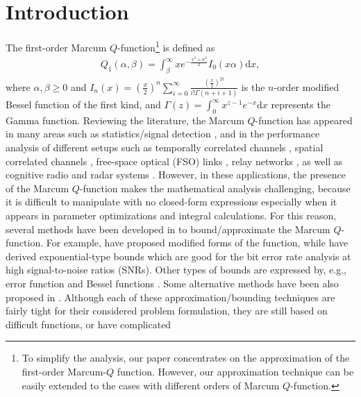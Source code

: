 \section{Introduction}
The first-order Marcum $Q$-function\footnote{To simplify the analysis, our paper concentrates on the approximation of the first-order Marcum-$Q$ function. However, our approximation technique can be easily extended to the cases with different orders of Marcum $Q$-function.} is defined as  \cite[Eq. (1)]{Bocus2013CLapproximation}
\begin{align}
    Q_1(\alpha,\beta) = \int_{\beta}^{\infty} xe^{-\frac{x^2+\alpha^2}{2}}I_0(x\alpha)\text{d}x,
\end{align}
where $\alpha, \beta \geq 0$ and $I_n(x) = (\frac{x}{2})^n \sum_{i=0}^{\infty}\frac{(\frac{x}{2})^{2i} }{i!\Gamma(n+i+1)}$ is the $n$-order modified Bessel function of the first kind, and $\Gamma(z) = \int_0^{\infty} x^{z-1}e^{-x} \mathrm{d}x$ represents the Gamma function. Reviewing the literature, the Marcum $Q$-function has appeared in many areas such as statistics/signal detection \cite{helstrom1994elements}, and in the performance analysis of different setups such as temporally correlated channels \cite{Makki2013TCfeedback}, spatial correlated channels \cite{Makki2011Eurasipcapacity},  free-space optical (FSO) links \cite{Makki2018WCLwireless}, relay networks \cite{Makki2016TVTperformance}, as well as  cognitive radio and radar systems \cite{Simon2003TWCsome,Suraweera2010TVTcapacity,Kang2003JSAClargest,Chen2004TCdistribution,Ma2000JSACunified,Zhang2002TCgeneral,Ghasemi2008ICMspectrum,Digham2007TCenergy, simon2002bookdigital,Cao2016CLsolutions,sofotasios2015solutions,Cui2012ELtwo,Azari2018TCultra,Alam2014INFOCOMWrobust,Gao2018IAadmm,Shen2018TVToutage,Song2017JLTimpact,Tang2019IAan}. However, in these applications, the presence of the Marcum $Q$-function makes the mathematical analysis challenging, because it is  difficult to manipulate  with no closed-form  expressions especially when it appears in parameter optimizations and integral calculations. For this reason, several methods have been developed in \cite{Bocus2013CLapproximation,Fu2011GLOBECOMexponential,zhao2008ELtight,Simon2000TCexponential,annamalai2001WCMCcauchy,Sofotasios2010ISWCSnovel,Li2010TCnew,andras2011Mathematicageneralized,Gaur2003TVTsome,Kam2008TCcomputing,Corazza2002TITnew,Baricz2009TITnew,chiani1999ELintegral}  to bound/approximate the Marcum $Q$-function. For example, \cite{Fu2011GLOBECOMexponential,zhao2008ELtight} have proposed  modified forms of the function, while \cite{Simon2000TCexponential,annamalai2001WCMCcauchy} have derived exponential-type bounds which are good for the bit error rate analysis at high signal-to-noise ratios (SNRs). Other types of bounds are expressed by, e.g., error function \cite{Kam2008TCcomputing} and Bessel functions \cite{Corazza2002TITnew,Baricz2009TITnew,chiani1999ELintegral}. Some alternative methods have been also proposed in \cite{Sofotasios2010ISWCSnovel,Li2010TCnew,andras2011Mathematicageneralized,Bocus2013CLapproximation,Gaur2003TVTsome}. Although each of these approximation/bounding techniques are fairly tight for their considered problem formulation, they are still based on difficult functions, or have complicated 